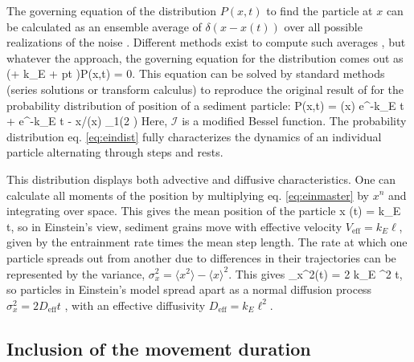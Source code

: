 The governing equation of the distribution $P(x,t)$ to find the particle at $x$ can be calculated as an ensemble average of $\delta(x-x(t))$ over all possible realizations of the noise \citep{Risken1984,Moss1989}. Different methods exist to compute such averages \citep{Hanggi1978, Hanggi1984, Balakrishnan1993, VanDenBroeck1983}, but whatever the approach, the governing equation for the distribution comes out as
\be  \big(\ell \px \pt + k_E \ell \px + pt \big)P(x,t) = 0. \label{eq:einmaster}\ee
This equation can be solved by standard methods (series solutions or transform calculus) \citep{Arfken1985,Prudnikov1986a} to reproduce the original result of \citet{Einstein1937} for the probability distribution of position of a sediment particle:
\be P(x,t) = \delta(x) e^{-k_E t} + e^{-k_E t - x/\ell}\theta(x) _1\Big(2 \Big) \ee
Here, $\mathcal{I}$ is a modified Bessel function. 
The probability distribution eq. \ref{eq:eindist} fully characterizes the dynamics of an individual particle alternating through steps and rests. 

This distribution displays both advective and diffusive characteristics.
One can calculate all moments of the position by multiplying eq. \ref{eq:einmaster} by $x^n$ and integrating over space. This gives the mean position of the particle
\be \langle x \rangle (t) = k_E \ell t, \ee
so in Einstein's view, sediment grains move with effective velocity $V_\text{eff} = k_E \ell$, given by the entrainment rate times the mean step length.
The rate at which one particle spreads out from another due to differences in their trajectories can be represented by the variance, $\sigma_x^2  = \langle x^2 \rangle - \langle x \rangle^2$. This gives
\be \sigma_x^2(t) = 2 k_E \ell^2 t, \ee
so particles in Einstein's model spread apart as a normal diffusion process $\sigma_x^2 = 2 D_\text{eff} t$ \citep{Sokolev2002}, with an effective diffusivity $D_\text{eff} = k_E \ell^2.$


\subsection{Inclusion of the movement duration}
\label{sec:lisle}

